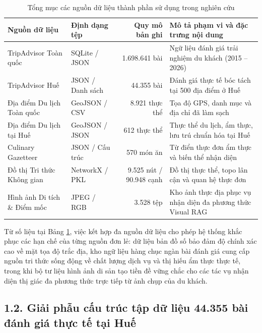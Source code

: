 \begin{table}[htbp]
\centering
\caption{Tổng mục các nguồn dữ liệu thành phần sử dụng trong nghiên cứu}
\label{tab:dataset-summary}
\small
\begin{tabularx}{\textwidth}{l l r X}
\hline
\textbf{Nguồn dữ liệu} & \textbf{Định dạng tệp} & \textbf{Quy mô bản ghi} & \textbf{Mô tả phạm vi và đặc trưng nội dung} \\
\hline
TripAdvisor Toàn quốc & SQLite / JSON & 1.698.641 bài & Ngữ liệu đánh giá trải nghiệm du khách (2015 -- 2026) \\
TripAdvisor Huế & JSON / Danh sách & 44.355 bài & Đánh giá thực tế bóc tách tại 500 địa điểm ở Huế \\
Địa điểm Du lịch Toàn quốc & GeoJSON / CSV & 8.921 thực thể & Tọa độ GPS, danh mục và địa chỉ đã làm sạch \\
Địa điểm Du lịch tại Huế & GeoJSON / JSON & 612 thực thể & Thực thể du lịch, ẩm thực, lưu trú chuẩn hóa tại Huế \\
Culinary Gazetteer & JSON / Cấu trúc & 570 món ăn & Từ điển thực đơn ẩm thực và biến thể nhận diện \\
Đồ thị Tri thức Không gian & NetworkX / PKL & 9.525 nút / 90.948 cạnh & Đồ thị thực thể, topo lân cận và quan hệ thực đơn \\
Hình ảnh Di tích \& Điểm mốc & JPEG / RGB & 3.528 tệp & Kho ảnh thực địa phục vụ nhận diện đa phương thức Visual RAG \\
\hline
\end{tabularx}
\end{table}

Từ số liệu tại Bảng \ref{tab:dataset-summary}, việc kết hợp đa nguồn dữ liệu cho phép hệ thống khắc phục các hạn chế của từng nguồn đơn lẻ: dữ liệu bản đồ số bảo đảm độ chính xác cao về mặt tọa độ trắc địa, kho ngữ liệu hàng chục ngàn bài đánh giá cung cấp nguồn tri thức sống động về chất lượng dịch vụ và thị hiếu ẩm thực thực tế, trong khi bộ tư liệu hình ảnh di sản tạo tiền đề vững chắc cho các tác vụ nhận diện thị giác đa phương thức trực tiếp từ ảnh chụp của du khách.

\subsection*{1.2. Giải phẫu cấu trúc tập dữ liệu 44.355 bài đánh giá thực tế tại Huế}
{}

